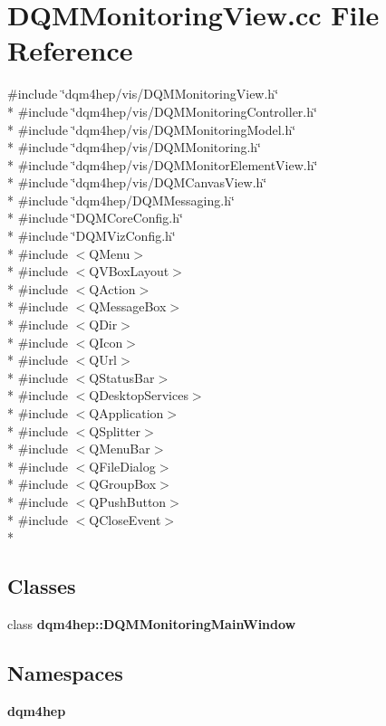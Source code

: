 \section{D\+Q\+M\+Monitoring\+View.\+cc File Reference}
\label{DQMMonitoringView_8cc}
{\ttfamily \#include \char`\"{}dqm4hep/vis/\+D\+Q\+M\+Monitoring\+View.\+h\char`\"{}}\\*
{\ttfamily \#include \char`\"{}dqm4hep/vis/\+D\+Q\+M\+Monitoring\+Controller.\+h\char`\"{}}\\*
{\ttfamily \#include \char`\"{}dqm4hep/vis/\+D\+Q\+M\+Monitoring\+Model.\+h\char`\"{}}\\*
{\ttfamily \#include \char`\"{}dqm4hep/vis/\+D\+Q\+M\+Monitoring.\+h\char`\"{}}\\*
{\ttfamily \#include \char`\"{}dqm4hep/vis/\+D\+Q\+M\+Monitor\+Element\+View.\+h\char`\"{}}\\*
{\ttfamily \#include \char`\"{}dqm4hep/vis/\+D\+Q\+M\+Canvas\+View.\+h\char`\"{}}\\*
{\ttfamily \#include \char`\"{}dqm4hep/\+D\+Q\+M\+Messaging.\+h\char`\"{}}\\*
{\ttfamily \#include \char`\"{}D\+Q\+M\+Core\+Config.\+h\char`\"{}}\\*
{\ttfamily \#include \char`\"{}D\+Q\+M\+Viz\+Config.\+h\char`\"{}}\\*
{\ttfamily \#include $<$Q\+Menu$>$}\\*
{\ttfamily \#include $<$Q\+V\+Box\+Layout$>$}\\*
{\ttfamily \#include $<$Q\+Action$>$}\\*
{\ttfamily \#include $<$Q\+Message\+Box$>$}\\*
{\ttfamily \#include $<$Q\+Dir$>$}\\*
{\ttfamily \#include $<$Q\+Icon$>$}\\*
{\ttfamily \#include $<$Q\+Url$>$}\\*
{\ttfamily \#include $<$Q\+Status\+Bar$>$}\\*
{\ttfamily \#include $<$Q\+Desktop\+Services$>$}\\*
{\ttfamily \#include $<$Q\+Application$>$}\\*
{\ttfamily \#include $<$Q\+Splitter$>$}\\*
{\ttfamily \#include $<$Q\+Menu\+Bar$>$}\\*
{\ttfamily \#include $<$Q\+File\+Dialog$>$}\\*
{\ttfamily \#include $<$Q\+Group\+Box$>$}\\*
{\ttfamily \#include $<$Q\+Push\+Button$>$}\\*
{\ttfamily \#include $<$Q\+Close\+Event$>$}\\*
\subsection*{Classes}
\begin{DoxyCompactItemize}
\item 
class {\bf dqm4hep\+::\+D\+Q\+M\+Monitoring\+Main\+Window}
\end{DoxyCompactItemize}
\subsection*{Namespaces}
\begin{DoxyCompactItemize}
\item 
 {\bf dqm4hep}
\end{DoxyCompactItemize}
